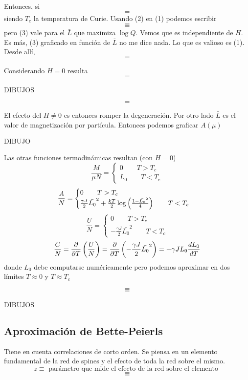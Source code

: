 \documentclass[10pt,oneside]{CBFT_book}
\begin{document}
Entonces, si
\[=\]
siendo $T_c$ la temperatura de Curie.
Usando (2) en (1) podemos escribir 
\[=\]
\[=\]
pero (3) vale para el $\bar{L}$ que maximiza $\log Q$. Vemos que es independiente de $H$.
Es más, (3) graficado en función de $\bar{L}$ no me dice nada. Lo que es valioso es (1).
Desde allí,
\[=\]

Considerando $H=0$ resulta
\[=\]

DIBUJOS

\[=\]

El efecto del $H\neq 0$ es entonces romper la degeneración. Por otro lado $\bar{L}$ es el valor de
magnetización por partícula. Entonces podemos graficar $A(\mu)$

DIBUJO

Las otras funciones termodinámicas resultan (con $H=0$)
\[
	\frac{M}{\mu N} = \begin{cases}
	                   0 \qquad T > T_c \\
	                   L_0 \qquad T< T_c
	                  \end{cases}
\]
\[
	\frac{A}{N} = \begin{cases}
	                   0 \qquad T > T_c \\
	                   \frac{\gamma J}{2}\bar{L_0}^2 + \frac{kT}{2} \log \left( \frac{ 1-\bar{L_0}^2 }{ 4 } \right)
	                   \qquad T< T_c
	                  \end{cases}
\]
\[
	\frac{U}{N} = \begin{cases}
	                   0 \qquad T > T_c \\
	                   -\frac{\gamma J}{2}\bar{L_0}^2 \qquad T< T_c
	                  \end{cases}
\]
\[
	\frac{C}{N} = \frac{\partial^{\hspace{-0.05em}} {}}{\partial {T}^{\hspace{-0.05em}}}\left( \frac{ U }{ N } \right) = \frac{\partial^{\hspace{-0.05em}} {}}{\partial {T}^{\hspace{-0.05em}}}\left(-\frac{\gamma J}{2}\bar{L_0}^2 \right)
	= - \gamma J L_0 \frac{d^{\hspace{-0.05em}} {L_0}}{d {T}^{\hspace{-0.05em}}}
\]
donde $L_0$ debe computarse numéricamente pero podemos aproximar en dos límites $T\approx 0$ y $T\approx T_c$

\[=\]
\[=\]

DIBUJOS

\subsection{Aproximación de Bette-Peierls}

Tiene en cuenta correlaciones de corto orden. Se piensa en un elemento fundamental de la red de spines y el
efecto de toda la red sobre el mismo.
\[
	z \equiv \text{ parámetro que mide el efecto de la red sobre el elemento }
\]
\[=\]
\[=\]
\end{document}
